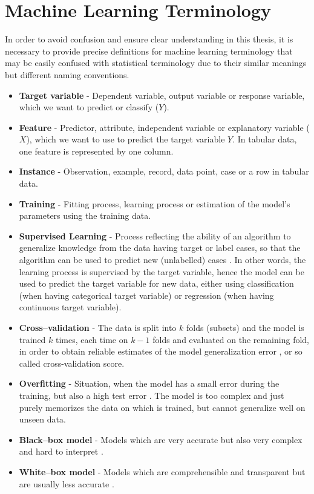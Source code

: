 \section{Machine Learning Terminology}
\label{sec:mlterms}
In order to avoid confusion and ensure clear understanding in this thesis, it is necessary to provide precise definitions for machine learning terminology that may be easily confused with statistical terminology due to their similar meanings but different naming conventions.
\begin{itemize}\setlength\itemsep{0em}
	\item \textbf{Target variable} - Dependent variable, output variable or response variable, which we want to predict or classify ($Y$).
	\item \textbf{Feature} - Predictor, attribute, independent variable or explanatory variable ($X$), which we want to use to predict the target variable $Y$. In tabular data, one feature is represented by one column.
	\item \textbf{Instance} - Observation, example, record, data point, case or a row in tabular data.
	\item \textbf{Training} - Fitting process, learning process or estimation of the model's parameters using the training data.
	\item \textbf{Supervised Learning} - Process reflecting the ability of an algorithm to generalize knowledge from the data having target or label cases, so that the algorithm can be used to predict new (unlabelled) cases \citep{berry2020supervised}.
    In other words, the learning process is supervised by the target variable, hence the model can be used to predict the target variable for new data, either using classification (when having categorical target variable) or regression (when having continuous target variable).
	\item \textbf{Cross--validation} - The data is split into $k$ folds (subsets) and the model is trained $k$ times, each time on $k-1$ folds and evaluated on the remaining fold, in order to obtain reliable estimates of the model generalization error \citep{tatsat2020machine}, or so called cross-validation score.
	\item \textbf{Overfitting} - Situation, when the model has a small error during the training, but also a high test error \citep{forsyth2019applied}. The model is too complex and just purely memorizes the data on which is trained, but cannot generalize well on unseen data.
	\item \textbf{Black--box model} - Models which are very accurate but also very complex and hard to interpret \citep{pintelas2020grey}.
	\item \textbf{White--box model} -  Models which are comprehensible and transparent but are usually less accurate  \citep{pintelas2020grey}.
\end{itemize}
\newpage

